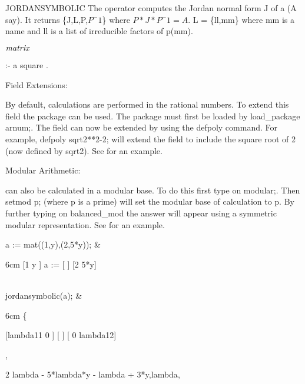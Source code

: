 \begin{Operator}[jordansymbolic]{JORDANSYMBOLIC}
The operator  computes the Jordan normal form J
of a  (A say). It returns \{J,L,P,$P^-1$\} where
$P*J*P^-1 = A$. L = \{ll,mm\} where mm is a name and ll is a list of
irreducible factors of p(mm).

\begin{Syntax}
\(\meta{matrix}\)

 :- a square .
\end{Syntax}

Field Extensions:

By default, calculations are performed in the rational numbers. To 
extend this field the  package can be used. The package must
first be loaded by  load\_package arnum;. The field can now be extended
by using the defpoly command. For example, defpoly sqrt2**2-2; will
extend the field to include the square root of 2 (now defined by sqrt2).
See  for an example.

Modular Arithmetic:

 can also be calculated in a modular base. To do this 
first type on  modular;. Then setmod p; (where p is a prime) will set 
the modular base of calculation to p. By further typing on balanced\_mod
the answer will appear using a symmetric modular representation. See 
 for an example.



\begin{Examples}

 a := mat((1,y),(2,5*y)); &
\begin{multilineoutput}{6cm}
     [1   y ]
a := [      ]
     [2  5*y]
\end{multilineoutput}\\

 jordansymbolic(a); &
\begin{multilineoutput}{6cm}
\{

 [lambda11     0    ]
 [                  ]
 [   0      lambda12]

 ,

         2
 {{lambda  - 5*lambda*y - lambda + 3*y},lambda},



\end{multilineoutput}
\end{Examples}
\end{Operator}

